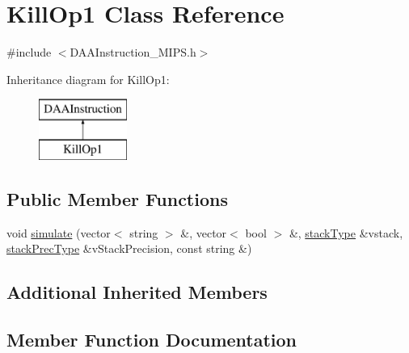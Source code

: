 \hypertarget{classKillOp1}{}\section{Kill\+Op1 Class Reference}
\label{classKillOp1}


{\ttfamily \#include $<$D\+A\+A\+Instruction\+\_\+\+M\+I\+P\+S.\+h$>$}

Inheritance diagram for Kill\+Op1\+:\begin{figure}[H]
\begin{center}
\leavevmode
\includegraphics[height=2.000000cm]{classKillOp1}
\end{center}
\end{figure}
\subsection*{Public Member Functions}
\begin{DoxyCompactItemize}
\item 
void \hyperlink{classKillOp1_a6339ad6983ea00502b4b48c4ed1e84d8}{simulate} (vector$<$ string $>$ \&, vector$<$ bool $>$ \&, \hyperlink{DAAInstruction_8h_a1b0e70ac1a04f06c8132055ed01f589f}{stack\+Type} \&vstack, \hyperlink{DAAInstruction_8h_ac5cb793e9dac3fa9693da78b7e29ab30}{stack\+Prec\+Type} \&v\+Stack\+Precision, const string \&)
\end{DoxyCompactItemize}
\subsection*{Additional Inherited Members}


\subsection{Member Function Documentation}
\mbox{\label{classKillOp1_a6339ad6983ea00502b4b48c4ed1e84d8}} 
